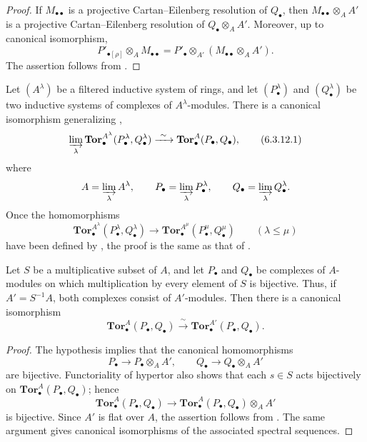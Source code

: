 \begin{proof}
If $M_{\bullet\bullet}$ is a projective Cartan--Eilenberg
resolution of $Q_\bullet$, then
$M_{\bullet\bullet}\otimes_AA'$ is a projective
Cartan--Eilenberg resolution of $Q_\bullet\otimes_AA'$.  Moreover,
up to canonical isomorphism,
\[
  P'_{\bullet[\rho]}\otimes_AM_{\bullet\bullet}
  =
  P'_\bullet\otimes_{A'}
  (M_{\bullet\bullet}\otimes_AA').
\]
The assertion follows from .
\end{proof}

\begin{remark}[6.3.12]
\label{III.6.3.12}
Let $(A^\lambda)$ be a filtered inductive system of rings, and let
$(P_\bullet^\lambda)$ and $(Q_\bullet^\lambda)$ be two inductive
systems of complexes of $A^\lambda$-modules.  There is a canonical
isomorphism generalizing ,
\[
  \varinjlim_\lambda
  \mathbf{Tor}_\bullet^{A^\lambda}
  (P_\bullet^\lambda,Q_\bullet^\lambda)
  \xrightarrow{\ \sim\ }
  \mathbf{Tor}_\bullet^A(P_\bullet,Q_\bullet),
  \tag{6.3.12.1}\label{III.6.3.12.1}
\]
where
\[
  A=\varinjlim_\lambda A^\lambda,
  \qquad
  P_\bullet=\varinjlim_\lambda P_\bullet^\lambda,
  \qquad
  Q_\bullet=\varinjlim_\lambda Q_\bullet^\lambda.
\]
Once the homomorphisms
\[
  \mathbf{Tor}_\bullet^{A^\lambda}
  (P_\bullet^\lambda,Q_\bullet^\lambda)
  \longrightarrow
  \mathbf{Tor}_\bullet^{A^\mu}
  (P_\bullet^\mu,Q_\bullet^\mu)
  \qquad(\lambda\leq\mu)
\]
have been defined by , the proof is the same as
that of .
\end{remark}

\begin{proposition}[6.3.13]
\label{III.6.3.13}
Let $S$ be a multiplicative subset of $A$, and let $P_\bullet$ and
$Q_\bullet$ be complexes of $A$-modules on which multiplication by
every element of $S$ is bijective.  Thus, if $A'=S^{-1}A$, both
complexes consist of $A'$-modules.  Then there is a canonical
isomorphism
\[
  \mathbf{Tor}_\bullet^A(P_\bullet,Q_\bullet)
  \xrightarrow{\ \sim\ }
  \mathbf{Tor}_\bullet^{A'}(P_\bullet,Q_\bullet).
\]
\end{proposition}

\begin{proof}
The hypothesis implies that the canonical homomorphisms
\[
  P_\bullet\longrightarrow P_\bullet\otimes_AA',
  \qquad
  Q_\bullet\longrightarrow Q_\bullet\otimes_AA'
\]
are bijective.  Functoriality of hypertor also shows that each
$s\in S$ acts bijectively on
$\mathbf{Tor}_\bullet^A(P_\bullet,Q_\bullet)$; hence
\[
  \mathbf{Tor}_\bullet^A(P_\bullet,Q_\bullet)
  \longrightarrow
  \mathbf{Tor}_\bullet^A(P_\bullet,Q_\bullet)\otimes_AA'
\]
is bijective.  Since $A'$ is flat over $A$, the assertion follows
from .  The same argument gives canonical
isomorphisms of the associated spectral sequences.
\end{proof}


